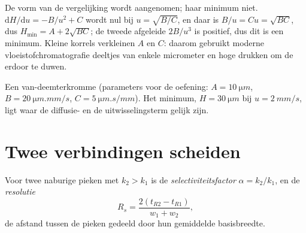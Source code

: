 \admitted

De vorm van de vergelijking wordt aangenomen; haar minimum niet. $\mathrm dH/\mathrm du = -B/u^2 + C$ wordt nul
bij $u = \sqrt{B/C}$, en daar is $B/u = Cu = \sqrt{BC}$, dus $H_{\min} = A + 2\sqrt{BC}$; de tweede
afgeleide $2B/u^3$ is positief, dus dit is een minimum. Kleine korrels verkleinen $A$ en $C$: daarom
gebruikt moderne vloeistofchromatografie deeltjes van enkele micrometer en hoge drukken om de  erdoor te duwen.

\begin{omfigure}

{\small Een van-deemterkromme (parameters voor de oefening: $A = \qty{10}{\micro m}$, $B = \qty{20}{\micro m.mm/s}$,
$C = \qty{5}{\micro m.s/mm}$). Het minimum, $H = \qty{30}{\micro m}$ bij $u = \qty{2}{mm/s}$, ligt waar
de diffusie- en de uitwisselingsterm gelijk zijn.}
\end{omfigure}

\section{Twee verbindingen scheiden}

\begin{definition}\label{def:b2:chromatography:separation}
Voor twee naburige pieken met $k_2 > k_1$ is de \emph{selectiviteitsfactor}
$\alpha = k_2/k_1$, en de \emph{resolutie}
\begin{equation*}
R_s = \frac{2(t_{R2} - t_{R1})}{w_1 + w_2},
\end{equation*}
de afstand tussen de pieken gedeeld door hun gemiddelde basisbreedte.
\end{definition}


